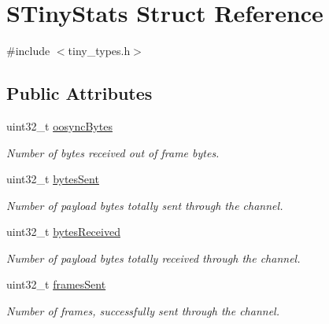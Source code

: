 \hypertarget{structSTinyStats}{}\section{S\+Tiny\+Stats Struct Reference}
\label{structSTinyStats}


{\ttfamily \#include $<$tiny\+\_\+types.\+h$>$}

\subsection*{Public Attributes}
\begin{DoxyCompactItemize}
\item 
\mbox{\label{structSTinyStats_a79119146606964d4e3345a0c019db329}} 
uint32\+\_\+t \hyperlink{structSTinyStats_a79119146606964d4e3345a0c019db329}{oosync\+Bytes}
\begin{DoxyCompactList}\small\item\em Number of bytes received out of frame bytes. \end{DoxyCompactList}\item 
\mbox{\label{structSTinyStats_a3ee26fa17e5afd758b4c7f2086bc0cbc}} 
uint32\+\_\+t \hyperlink{structSTinyStats_a3ee26fa17e5afd758b4c7f2086bc0cbc}{bytes\+Sent}
\begin{DoxyCompactList}\small\item\em Number of payload bytes totally sent through the channel. \end{DoxyCompactList}\item 
\mbox{\label{structSTinyStats_ab58c342d0fc862c193bff6f71dc725ac}} 
uint32\+\_\+t \hyperlink{structSTinyStats_ab58c342d0fc862c193bff6f71dc725ac}{bytes\+Received}
\begin{DoxyCompactList}\small\item\em Number of payload bytes totally received through the channel. \end{DoxyCompactList}\item 
\mbox{\label{structSTinyStats_a0bc110aa81a7dea0d0d64e359fb06dc3}} 
uint32\+\_\+t \hyperlink{structSTinyStats_a0bc110aa81a7dea0d0d64e359fb06dc3}{frames\+Sent}
\begin{DoxyCompactList}\small\item\em Number of frames, successfully sent through the channel. \end{DoxyCompactList}\item 

\end{DoxyCompactItemize}
